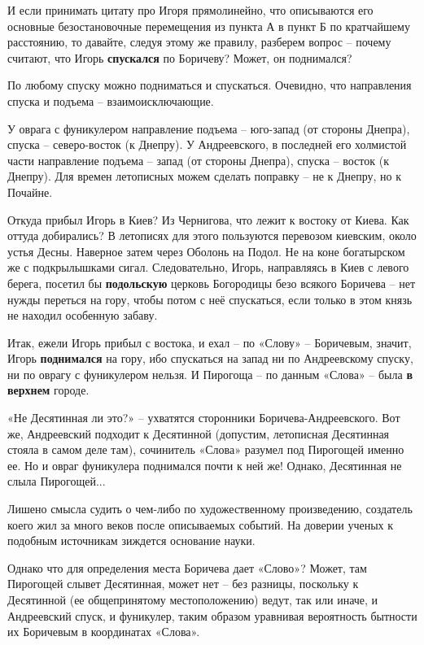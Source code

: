 И если принимать цитату про Игоря прямолинейно, что описываются его основные безостановочные перемещения из пункта А в пункт Б по кратчайшему расстоянию, то давайте, следуя этому же правилу, разберем вопрос – почему считают, что Игорь \textbf{спускался} по Боричеву? Может, он поднимался?

По любому спуску можно подниматься и спускаться. Очевидно, что направления спуска и подъема – взаимоисключающие.

У оврага с фуникулером направление подъема – юго-запад (от стороны Днепра), спуска – северо-восток (к Днепру). У Андреевского, в последней его холмистой части направление подъема – запад (от стороны Днепра), спуска – восток (к Днепру). Для времен летописных можем сделать поправку – не к Днепру, но к Почайне.

Откуда прибыл Игорь в Киев? Из Чернигова, что лежит к востоку от Киева. Как оттуда добирались? В летописях для этого пользуются перевозом киевским, около устья Десны. Наверное затем через Оболонь на Подол. Не на коне богатырском же с подкрылышками сигал. Следовательно, Игорь, направляясь в Киев с левого берега, посетил бы \textbf{подольскую} церковь Богородицы безо всякого Боричева – нет нужды переться на гору, чтобы потом с неё спускаться, если только в этом князь не находил особенную забаву.

Итак, ежели Игорь прибыл с востока, и ехал – по «Слову» – Боричевым, значит, Игорь \textbf{поднимался} на гору, ибо спускаться на запад ни по Андреевскому спуску, ни по оврагу с  фуникулером нельзя. И Пирогоща  – по данным «Слова» – была \textbf{в верхнем} городе. 

«Не Десятинная ли это?» – ухватятся сторонники Боричева-Андреевского. Вот же, Андреевский подходит к Десятинной (допустим, летописная Десятинная стояла в самом деле там), сочинитель «Слова» разумел под Пирогощей именно ее. Но и овраг фуникулера поднимался почти к ней же! Однако, Десятинная не слыла Пирогощей...

Лишено смысла судить о чем-либо по художественному произведению, создатель коего жил за много веков после описываемых событий. На доверии ученых к подобным источникам зиждется основание науки. 

Однако что для определения места Боричева дает «Слово»? Может, там Пирогощей слывет Десятинная, может нет – без разницы, поскольку к Десятинной (ее общепринятому местоположению) ведут, так или иначе, и Андреевский спуск, и фуникулер, таким образом уравнивая вероятность бытности их Боричевым в координатах «Слова».
